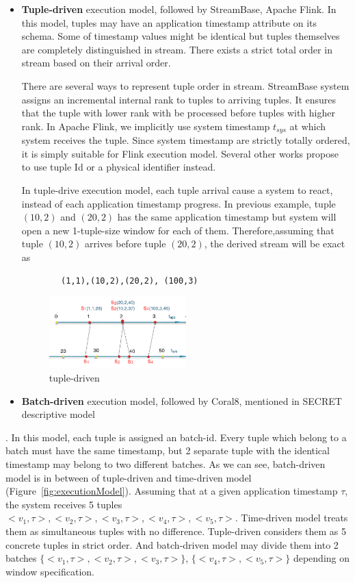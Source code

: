 \begin{itemize}
	\item \textbf{Tuple-driven} execution model, followed by StreamBase, Apache Flink. In this model, tuples may have an application timestamp attribute on its schema. Some of timestamp values might be identical but tuples themselves are completely distinguished in stream. There exists a strict total order in stream based on their arrival order. 
	
	There are several ways to represent tuple order in stream. StreamBase system assigns an incremental internal rank to tuples to arriving tuples. It ensures that the tuple with lower rank with be processed before tuples with higher rank. In Apache Flink, we implicitly use system timestamp   $t_{sys}$ at which system receives the tuple. Since system timestamp are strictly totally ordered, it is simply suitable for Flink execution model. Several other works propose to use tuple Id \citep{Dindar:2013} or a physical identifier\citep{Petit:2010} instead. 	
	
	In tuple-drive execution model, each tuple arrival cause a system to react, instead of each application timestamp progress. In previous example, tuple $(10,2)$ and $(20,2)$ has the same application timestamp but system will open a new 1-tuple-size window for each of them. Therefore,assuming that tuple $(10,2)$ arrives before tuple $(20,2)$, the derived stream will be exact as 
	\begin{verbatim}
		(1,1),(10,2),(20,2), (100,3)
	\end{verbatim}
	
	\begin{figure}[htbp!] 
\centering    
\includegraphics[width=0.5\textwidth]{tuple-driven}
\caption{tuple-driven}
\label{fig:tuple-driven}
\end{figure}
	
	\item \textbf{Batch-driven} execution model, followed by Coral8, mentioned in SECRET\citep{Botan:2010} descriptive model
\end{itemize}. In this model, each tuple is assigned an batch-id. Every tuple which belong to a batch must have the same timestamp, but 2 separate tuple with the identical timestamp may belong to two different batches. As we can see, batch-driven model is in between of tuple-driven and time-driven model (Figure~\ref{fig:executionModel}). Assuming that at a given application timestamp $\tau$, the system receives 5 tuples ${<v_1,\tau>,<v_2,\tau>,<v_3,\tau>,<v_4,\tau>,<v_5,\tau>}$. Time-driven model treats them as simultaneous tuples with no difference. Tuple-driven considers them as 5 concrete tuples in strict order. And batch-driven model may divide them into 2 batches $\{<v_1,\tau>,<v_2,\tau>,<v_3,\tau>\}$, $\{<v_4,\tau>,<v_5,\tau>\}$ depending on window specification.


